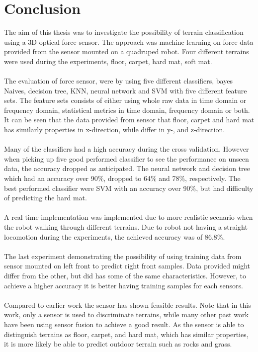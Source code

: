 \documentclass[USenglish]{ifimaster}  %
\begin{document}
\section{Conclusion}
The aim of this thesis was to investigate the possibility of terrain classification using a 3D optical force sensor. The approach was machine learning on force data provided from the sensor mounted on a quadruped robot. Four different terrains were used during the experiments, floor, carpet, hard mat, soft mat. 
\\
\\
The evaluation of force sensor, were by using five different classifiers, bayes Naives, decision tree, KNN, neural network and SVM with five different feature sets. The feature sets consists of either using whole raw data in time domain or frequency domain, statistical metrics in time domain, frequency domain or both. It can be seen that the data provided from sensor that floor, carpet and hard mat has similarly properties in x-direction, while differ in y-, and z-direction. 
\\
\\
Many of the classifiers had a high accuracy during the cross validation. However when picking up five good performed classifier to see the performance on unseen data, the accuracy dropped as anticipated. The neural network and decision tree which had an accuracy over 90\%, dropped to 64\% and 78\%, respectively. The best performed classifier were SVM with an accuracy over 90\%, but had difficulty of predicting the hard mat.
\\
\\
A real time implementation was implemented due to more realistic scenario when the robot walking through different terrains. Due to robot not having a straight locomotion during the experiments, the achieved accuracy was of 86.8\%. 
\\
\\
The last experiment demonstrating the possibility of using training data from sensor mounted on left front to predict right front samples. Data provided might differ from the other, but did has some of the same characteristics. However, to achieve a higher accuracy it is better having training samples for each sensors. 
\\
\\
Compared to earlier work the sensor has shown feasible results. Note that in this work, only a sensor is used to discriminate terrains, while many other past work have been using sensor fusion to achieve a good result. As the sensor is able to distinguish terrains as floor, carpet, and hard mat, which has similar properties, it is more likely be able to predict outdoor terrain such as rocks and grass.
	
\end{document}
